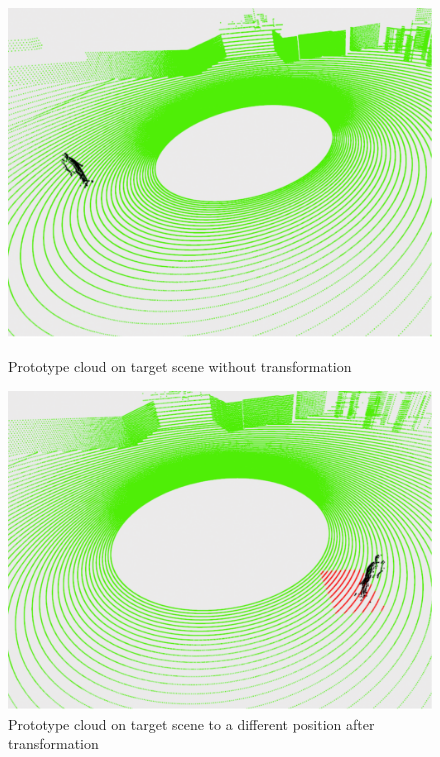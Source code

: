 \begin{figure}[htbp]
    \centering
    \begin{minipage}[b]{0.45\textwidth}
    \centering
    \includegraphics[width=1\linewidth]{97_graphics/results/prototype_on_target_scene_original_location.pdf}
    \caption{Prototype cloud on target scene without transformation}
    \label{fig:result-prototype_on_target_scene_original_location}
    \end{minipage}
    \hfill
    \begin{minipage}[b]{0.45\textwidth}
    \centering
    \includegraphics[width=1\linewidth]{97_graphics/results/prototype_on_target_scene_different_location.pdf}
    \caption{Prototype cloud on target scene to a different position after transformation}
    \label{fig:result-prototype_on_target_scene_different_location}
    \end{minipage}
\end{figure}

